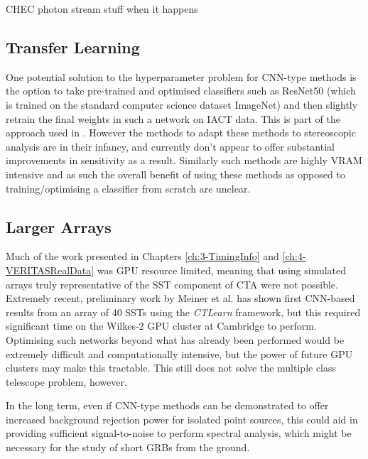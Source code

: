 CHEC photon stream stuff when it happens
\subsection{Transfer Learning}
One potential solution to the hyperparameter problem for CNN-type methods is the option to take pre-trained and optimised classifiers such as ResNet50 \cite{resnet50} (which is trained on the standard computer science dataset ImageNet) and then slightly retrain the final weights in such a network on IACT data. This is part of the approach used in \cite{tjarkicrc}. However the methods to adapt these methods to stereoscopic analysis are in their infancy, and currently don't appear to offer substantial improvements in sensitivity as a result. Similarly such methods are highly VRAM intensive and as such the overall benefit of using these methods as opposed to training/optimising a classifier from scratch are unclear.


\subsection{Larger Arrays}
Much of the work presented in Chapters \ref{ch:3-TimingInfo} and \ref{ch:4-VERITASRealData} was GPU resource limited, meaning that using simulated arrays truly representative of the SST component of CTA were not possible. Extremely recent, preliminary work by Meiner et al. \cite{tjarkicrc} has shown first CNN-based results from an array of 40 SSTs using the \textit{CTLearn} framework, but this required significant time on the Wilkes-2 GPU cluster at Cambridge to perform. Optimising such networks beyond what has already been performed would be extremely difficult and computationally intensive, but the power of future GPU clusters may make this tractable. This still does not solve the multiple class telescope problem, however.

In the long term, even if CNN-type methods can be demonstrated to offer increased background rejection power for isolated point sources, this could aid in providing sufficient signal-to-noise to perform spectral analysis, which might be necessary for the study of short GRBs from the ground.